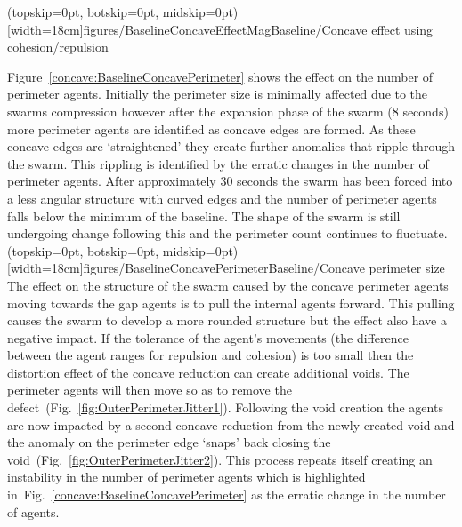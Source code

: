 \documentclass{ieeeaccess}
\begin{document}
\Figure[t!](topskip=0pt, botskip=0pt, midskip=0pt)[width=18cm]{figures/BaselineConcaveEffectMag}{Baseline/Concave effect using cohesion/repulsion\label{concave:BaselineConcaveEffectMag}}

Figure~\ref{concave:BaselineConcavePerimeter} shows the effect on the number of perimeter agents. Initially the perimeter size is minimally affected due to the swarms compression however after the expansion phase of the swarm (8 seconds) more perimeter agents are identified as concave edges are formed. As these concave edges are `straightened' they create further anomalies that ripple through the swarm. This rippling is identified by the erratic changes in the number of perimeter agents. After approximately 30 seconds the swarm has been forced into a less angular structure with curved edges and the number of perimeter agents falls below the minimum of the baseline. The shape of the swarm is still undergoing change following this and the perimeter count continues to fluctuate.
\Figure[t!](topskip=0pt, botskip=0pt, midskip=0pt)[width=18cm]{figures/BaselineConcavePerimeter}{Baseline/Concave perimeter size\label{concave:BaselineConcavePerimeter}}
The effect on the structure of the swarm caused by the concave perimeter agents moving towards the gap agents is to pull the internal agents forward. This pulling causes the swarm to develop a more rounded structure but the effect also have a negative impact. If the tolerance of the agent's movements (the difference between the agent ranges for repulsion and cohesion) is too small then the distortion effect of the concave reduction can create additional voids. The perimeter agents will then move so as to remove the defect~(Fig.~\ref{fig:OuterPerimeterJitter1}). Following the void creation the agents are now impacted by a second concave reduction from the newly created void and the anomaly on the perimeter edge `snaps' back closing the void~(Fig.~\ref{fig:OuterPerimeterJitter2}). This process repeats itself creating an instability in the number of perimeter agents which is highlighted in~Fig.~\ref{concave:BaselineConcavePerimeter} as the erratic change in the number of agents. 
\end{document}
